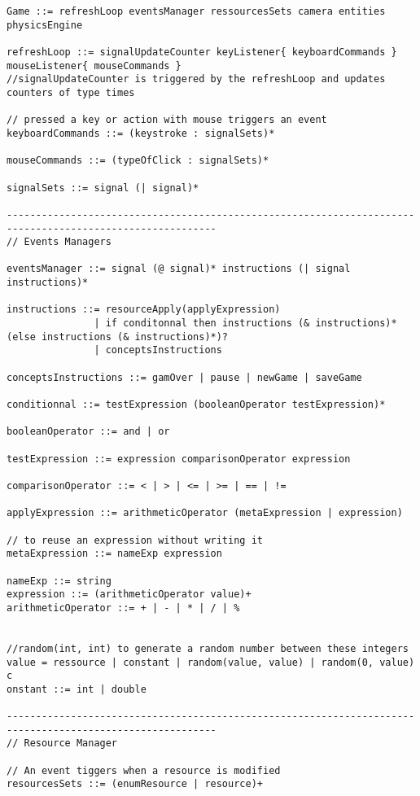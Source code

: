 \begin{lstlisting}[language=Grammar]
 Game ::= refreshLoop eventsManager ressourcesSets camera entities physicsEngine

refreshLoop ::= signalUpdateCounter keyListener{ keyboardCommands } mouseListener{ mouseCommands }
//signalUpdateCounter is triggered by the refreshLoop and updates counters of type times

// pressed a key or action with mouse triggers an event
keyboardCommands ::= (keystroke : signalSets)*

mouseCommands ::= (typeOfClick : signalSets)*

signalSets ::= signal (| signal)*

----------------------------------------------------------------------------------------------------------
// Events Managers

eventsManager ::= signal (@ signal)* instructions (| signal instructions)*

instructions ::= resourceApply(applyExpression) 
               | if conditonnal then instructions (& instructions)* (else instructions (& instructions)*)? 
               | conceptsInstructions

conceptsInstructions ::= gamOver | pause | newGame | saveGame

conditionnal ::= testExpression (booleanOperator testExpression)*

booleanOperator ::= and | or

testExpression ::= expression comparisonOperator expression

comparisonOperator ::= < | > | <= | >= | == | !=

applyExpression ::= arithmeticOperator (metaExpression | expression)

// to reuse an expression without writing it
metaExpression ::= nameExp expression

nameExp ::= string
expression ::= (arithmeticOperator value)+
arithmeticOperator ::= + | - | * | / | %


//random(int, int) to generate a random number between these integers
value = ressource | constant | random(value, value) | random(0, value)
c
onstant ::= int | double

----------------------------------------------------------------------------------------------------------
// Resource Manager

// An event tiggers when a resource is modified
resourcesSets ::= (enumResource | resource)+



\end{lstlisting}
